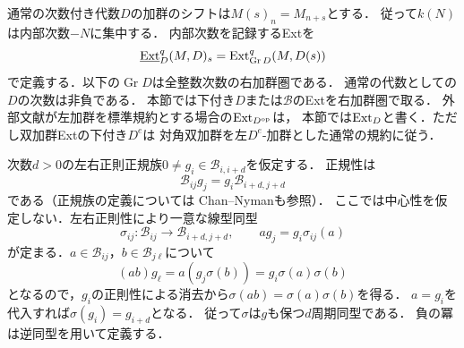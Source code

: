 通常の次数付き代数$D$の加群のシフトは$M(s)_n=M_{n+s}$とする．
従って$k(N)$は内部次数$-N$に集中する．
内部次数を記録するExtを
\begin{equation}
 \underline{\operatorname{Ext}}^{q}_{D}(M,D)_s
  =\operatorname{Ext}^q_{\operatorname{Gr}D}(M,D(s))
\end{equation}
で定義する．以下の$\operatorname{Gr}D$は全整数次数の右加群圏である．
通常の代数としての$D$の次数は非負である．
本節では下付き$D$または$\mathcal B$のExtを右加群圏で取る．
外部文献が左加群を標準規約とする場合の$\operatorname{Ext}_{D^{\rm op}}$は，
本節では$\operatorname{Ext}_D$と書く．ただし双加群Extの下付き$D^e$は
対角双加群を左$D^e$-加群とした通常の規約に従う．

次数$d>0$の左右正則正規族$0\ne g_i\in\mathcal B_{i,i+d}$を仮定する．
正規性は
\begin{equation}\label{eq:moduli-ambient-normal-family}
 \mathcal B_{ij}g_j=g_i\mathcal B_{i+d,j+d}
\end{equation}
である（正規族の定義については
Chan--Nyman\cite[Definition~8.6]{PChanNymanNormalFamily}も参照）．
ここでは中心性を仮定しない．左右正則性により一意な線型同型
\begin{equation}\label{eq:moduli-ambient-sigma}
 \sigma_{ij}:\mathcal B_{ij}\longrightarrow\mathcal B_{i+d,j+d},
 \qquad ag_j=g_i\sigma_{ij}(a)
\end{equation}
が定まる．$a\in\mathcal B_{ij}$，$b\in\mathcal B_{j\ell}$について
\begin{equation}
 (ab)g_\ell
  =a(g_j\sigma(b))
  =g_i\sigma(a)\sigma(b)
\end{equation}
となるので，$g_i$の正則性による消去から$\sigma(ab)=\sigma(a)\sigma(b)$を得る．
$a=g_i$を代入すれば$\sigma(g_i)=g_{i+d}$となる．
従って$\sigma$は$g$も保つ$d$周期同型である．
負の冪は逆同型を用いて定義する．


